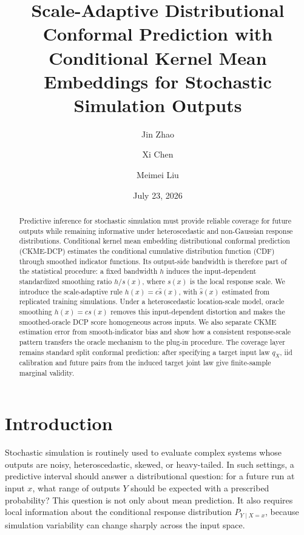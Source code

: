 \documentclass[11pt]{article}
\title{Scale-Adaptive Distributional Conformal Prediction with\\
Conditional Kernel Mean Embeddings for Stochastic Simulation Outputs}
\author{Jin Zhao \and Xi Chen \and Meimei Liu}
\date{July 23, 2026}
\newif\ifincludeexperiments
\begin{document}
\maketitle

\begin{abstract}
Predictive inference for stochastic simulation must provide reliable coverage for future outputs while remaining informative under heteroscedastic and non-Gaussian response distributions. Conditional kernel mean embedding distributional conformal prediction (CKME-DCP) estimates the conditional cumulative distribution function (CDF) through smoothed indicator functions. Its output-side bandwidth is therefore part of the statistical procedure: a fixed bandwidth \(h\) induces the input-dependent standardized smoothing ratio \(h/s(x)\), where \(s(x)\) is the local response scale. We introduce the scale-adaptive rule \(h(x)=c\widehat s(x)\), with \(\widehat s(x)\) estimated from replicated training simulations. Under a heteroscedastic location-scale model, oracle smoothing \(h(x)=c s(x)\) removes this input-dependent distortion and makes the smoothed-oracle DCP score homogeneous across inputs. We also separate CKME estimation error from smooth-indicator bias and show how a consistent response-scale pattern transfers the oracle mechanism to the plug-in procedure. The coverage layer remains standard split conformal prediction: after specifying a target input law \(q_X\), iid calibration and future pairs from the induced target joint law give finite-sample marginal validity.
\ifincludeexperiments
In a paired benchmark with 50 macroreplications, all three bandwidth rules retain approximately 90\% raw-score marginal coverage. Oracle scale normalization substantially reduces the score-heterogeneity diagnostic on the Gaussian and heavy-tailed raised-floor models. The sample-SD plus Nadaraya--Watson plug-in's raw relative scale error declines as the training budget grows, and its score diagnostic moves toward the oracle in those two models, but its interval-score and groupwise gains are data-generating-process dependent.
\fi
\end{abstract}

\section{Introduction}

Stochastic simulation is routinely used to evaluate complex systems whose outputs are noisy, heteroscedastic, skewed, or heavy-tailed. In such settings, a predictive interval should answer a distributional question: for a future run at input \(x\), what range of outputs \(Y\) should be expected with a prescribed probability? This question is not only about mean prediction. It also requires local information about the conditional response distribution \(P_{Y\mid X=x}\), because simulation variability can change sharply across the input space.
\end{document}
